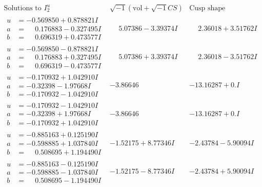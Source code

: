 \documentclass[1p]{elsarticle_modified}
\theoremstyle{definition}
\newcommand{\I}{\sqrt{-1}}
\begin{document}
$$\begin{array}{c|c|c}  
\text{Solutions to }I^u_{2}& \I (\text{vol} + \sqrt{-1}CS) & \text{Cusp shape}\\
 \hline 
\begin{aligned}
u &= -0.569850 + 0.878821 I \\
a &= \phantom{-}0.176883 - 0.327495 I \\
b &= \phantom{-}0.696319 + 0.473577 I\end{aligned}
 & \phantom{-}5.07386 - 3.39374 I & \phantom{-}2.36018 + 3.51762 I \\ \hline\begin{aligned}
u &= -0.569850 - 0.878821 I \\
a &= \phantom{-}0.176883 + 0.327495 I \\
b &= \phantom{-}0.696319 - 0.473577 I\end{aligned}
 & \phantom{-}5.07386 + 3.39374 I & \phantom{-}2.36018 - 3.51762 I \\ \hline\begin{aligned}
u &= -0.170932 + 1.042910 I \\
a &= -0.32398 - 1.97668 I \\
b &= -0.170932 - 1.042910 I\end{aligned}
 & -3.86646\phantom{ +0.000000I} & -13.16287 + 0. I\phantom{ +0.000000I} \\ \hline\begin{aligned}
u &= -0.170932 - 1.042910 I \\
a &= -0.32398 + 1.97668 I \\
b &= -0.170932 + 1.042910 I\end{aligned}
 & -3.86646\phantom{ +0.000000I} & -13.16287 + 0. I\phantom{ +0.000000I} \\ \hline\begin{aligned}
u &= -0.885163 + 0.125190 I \\
a &= -0.598885 + 1.037840 I \\
b &= \phantom{-}0.508695 + 1.194490 I\end{aligned}
 & -1.52175 + 8.77346 I & -2.43784 - 5.90094 I \\ \hline\begin{aligned}
u &= -0.885163 - 0.125190 I \\
a &= -0.598885 - 1.037840 I \\
b &= \phantom{-}0.508695 - 1.194490 I\end{aligned}
 & -1.52175 - 8.77346 I & -2.43784 + 5.90094 I \\ \hline\begin{aligned}

\end{aligned}
\end{array}$$
\end{document}
